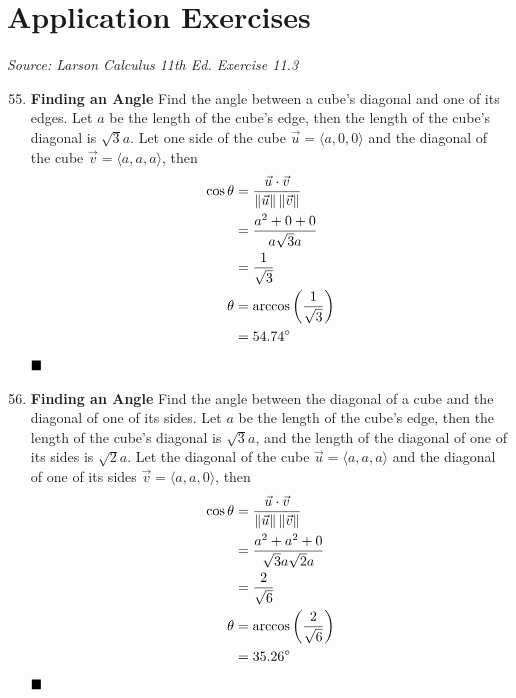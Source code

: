 \newpage
\section*{Application Exercises}
\textit{Source: Larson Calculus 11th Ed. Exercise 11.3}

\begin{enumerate}
    \setcounter{enumi}{54}
    \item \textbf{Finding an Angle} Find the angle between a cube's diagonal and one of its edges.
          \sol{} Let $a$ be the length of the cube's edge, then the length of the cube's diagonal is $\sqrt{3}a$. Let one side of the cube $\vec{u} = \langle a, 0, 0 \rangle$ and the diagonal of the cube $\vec{v} = \langle a, a, a \rangle$, then
          \begin{align*}
              \cos\theta & = \frac{\vec{u} \cdot \vec{v}}{\left\lVert\vec{u}\right\rVert \left\lVert\vec{v}\right\rVert} \\
                         & = \frac{a^2 + 0 + 0}{a\sqrt{3}a}                              \\
                         & = \frac{1}{\sqrt{3}}                                          \\
              \theta     & = \arccos\left(\frac{1}{\sqrt{3}}\right)                      \\
                         & = 54.74^{\circ}
          \end{align*}
          $\hfill\blacksquare$

    \item \textbf{Finding an Angle} Find the angle between the diagonal of a cube and the diagonal of one of its sides.
          \sol{} Let $a$ be the length of the cube's edge, then the length of the cube's diagonal is $\sqrt{3}a$, and the length of the diagonal of one of its sides is $\sqrt{2}a$. Let the diagonal of the cube $\vec{u} = \langle a, a, a \rangle$ and the diagonal of one of its sides $\vec{v} = \langle a, a, 0 \rangle$, then
          \begin{align*}
              \cos\theta & = \frac{\vec{u} \cdot \vec{v}}{\left\lVert\vec{u}\right\rVert \left\lVert\vec{v}\right\rVert} \\
                         & = \frac{a^2 + a^2 + 0}{\sqrt{3}a\sqrt{2}a}                    \\
                         & = \frac{2}{\sqrt{6}}                                          \\
              \theta     & = \arccos\left(\frac{2}{\sqrt{6}}\right)                      \\
                         & = 35.26^{\circ}
          \end{align*}
          $\hfill\blacksquare$


\end{enumerate}
